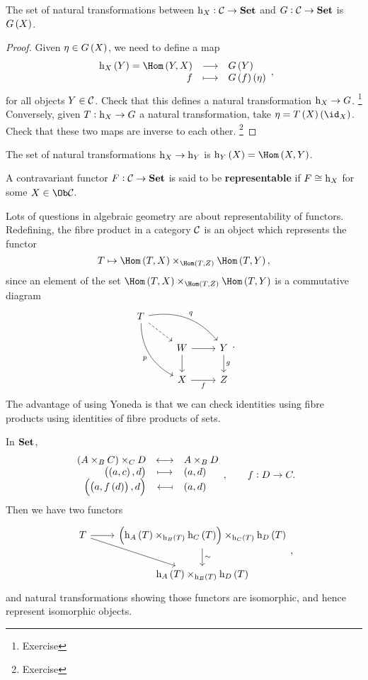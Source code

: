 \begin{lemma}
The set of natural transformations between $ \mathrm{h}_X : \mathcal{C} \to \textbf{Set} $ and $ G : \mathcal{C} \to \textbf{Set} $ is $ G\br{X} $.
\end{lemma}

\begin{proof}
Given $ \eta \in G\br{X} $, we need to define a map
$$ \function{\h_X\br{Y} = \Hom\br{Y, X}}{G\br{Y}}{f}{G\br{f}\br{\eta}}, $$
for all objects $ Y \in \mathcal{C} $. Check that this defines a natural transformation $ \mathrm{h}_X \to G $. \footnote{Exercise} Conversely, given $ T : \mathrm{h}_X \to G $ a natural transformation, take $ \eta = T\br{X}\br{\id_X} $. Check that these two maps are inverse to each other. \footnote{Exercise}
\end{proof}

\pagebreak

\begin{corollary}
The set of natural transformations $ \mathrm{h}_X \to \mathrm{h}_Y $ is $ \h_Y\br{X} = \Hom\br{X, Y} $.
\end{corollary}

\begin{definition*}
A contravariant functor $ F : \mathcal{C} \to \textbf{Set} $ is said to be \textbf{representable} if $ F \cong \mathrm{h}_X $ for some $ X \in \Ob \CCC $.
\end{definition*}

Lots of questions in algebraic geometry are about representability of functors. Redefining, the fibre product in a category $ \mathcal{C} $ is an object which represents the functor
$$ T \mapsto \Hom\br{T, X} \times_{\Hom\br{T, Z}} \Hom\br{T, Y}, $$
since an element of the set $ \Hom\br{T, X} \times_{\Hom\br{T, Z}} \Hom\br{T, Y} $ is a commutative diagram
$$
\begin{tikzcd}
T \arrow[dashed]{dr} \arrow[bend left=30]{drr}{q} \arrow[bend right=30]{ddr}[swap]{p} & & \\
& W \arrow{r} \arrow{d} & Y \arrow{d}{g} \\
& X \arrow{r}[swap]{f} & Z
\end{tikzcd}.
$$
The advantage of using Yoneda is that we can check identities using fibre products using identities of fibre products of sets.

\begin{example*}
In $ \textbf{Set} $,
$$ \bijection{\br{A \times_B C} \times_C D}{A \times_B D}{\br{\br{a, c}, d}}{\br{a, d}}{\br{\br{a, f\br{d}}, d}}{\br{a, d}}, \qquad f : D \to C. $$
Then we have two functors
$$
\begin{tikzcd}
T \arrow{r} \arrow{dr} & \br{\h_A\br{T} \times_{\h_B\br{T}} \h_C\br{T}} \times_{\h_C\br{T}} \h_D\br{T} \arrow{d}{\sim} \\
& \h_A\br{T} \times_{\h_B\br{T}} \h_D\br{T}
\end{tikzcd},
$$
and natural transformations showing those functors are isomorphic, and hence represent isomorphic objects.
\end{example*}

